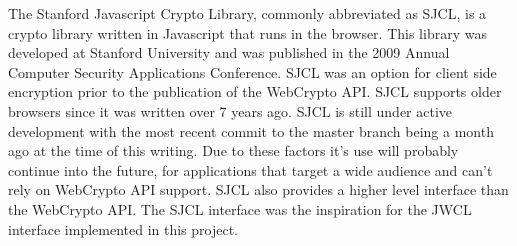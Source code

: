 The Stanford Javascript Crypto Library, commonly abbreviated as SJCL, is a crypto library written in Javascript that runs in the browser. This library was developed at Stanford University and was published in the 2009 Annual Computer Security Applications Conference. \cite{sjcl-paper} SJCL was an option for client side encryption prior to the publication of the WebCrypto API. SJCL supports older browsers since it was written over 7 years ago. SJCL is still under active development with the most recent commit to the master branch being a month ago at the time of this writing. \cite{sjcl-library} Due to these factors it’s use will probably continue into the future, for applications that target a wide audience and can’t rely on WebCrypto API support. SJCL also provides a higher level interface than the WebCrypto API. The SJCL interface was the inspiration for the JWCL interface implemented in this project.















